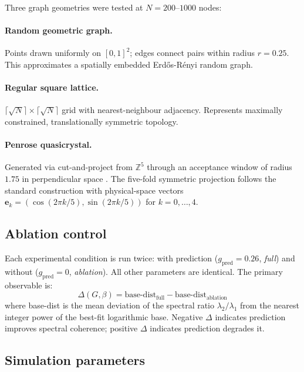 \documentclass[12pt,a4paper]{article}
\theoremstyle{plain}
\theoremstyle{definition}
\renewcommand{\vec}[1]{\bm{#1}}
\begin{document}
Three graph geometries were tested at $N = 200$--$1000$ nodes:

\paragraph{Random geometric graph.}
Points drawn uniformly on $[0,1]^2$; edges connect pairs within
radius $r = 0.25$. This approximates a spatially embedded
Erd\H{o}s-R\'enyi random graph.

\paragraph{Regular square lattice.}
$\lceil\sqrt{N}\rceil \times \lceil\sqrt{N}\rceil$ grid with
nearest-neighbour adjacency. Represents maximally constrained,
translationally symmetric topology.

\paragraph{Penrose quasicrystal.}
Generated via cut-and-project from $\mathbb{Z}^5$ through an acceptance
window of radius $1.75$ in perpendicular space \citep{penrose1974,debruijn1981}.
The five-fold symmetric projection follows the standard construction with
physical-space vectors
$\vec{e}_k = (\cos(2\pi k/5), \sin(2\pi k/5))$ for $k = 0,\ldots,4$.

\subsection{Ablation control}

Each experimental condition is run twice: with prediction
($g_{\text{pred}} = 0.26$, \emph{full}) and without
($g_{\text{pred}} = 0$, \emph{ablation}). All other parameters are
identical. The primary observable is:
\begin{equation}
\Delta(G,\beta) = \text{base-dist}_{\text{full}} -
  \text{base-dist}_{\text{ablation}}
\end{equation}
where base-dist is the mean deviation of the spectral ratio
$\lambda_2/\lambda_1$ from the nearest integer power of the best-fit
logarithmic base. Negative $\Delta$ indicates prediction improves spectral
coherence; positive $\Delta$ indicates prediction degrades it.

\subsection{Simulation parameters}
\end{document}

